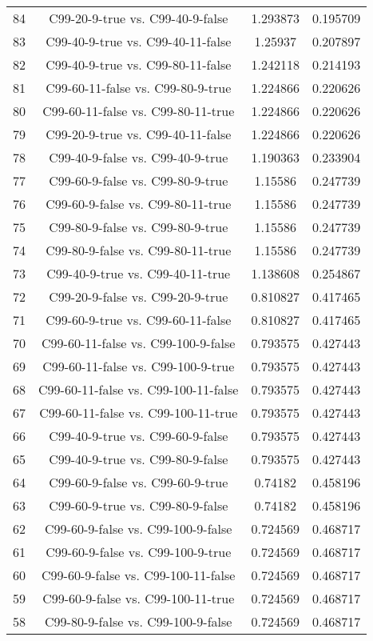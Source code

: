 \documentclass[a4paper,10pt]{article}
\begin{document}
\begin{landscape}
\begin{table}[!htp]
\begin{tabular}{cccc}
84&C99-20-9-true vs. C99-40-9-false&1.293873&0.195709\\
83&C99-40-9-true vs. C99-40-11-false&1.25937&0.207897\\
82&C99-40-9-true vs. C99-80-11-false&1.242118&0.214193\\
81&C99-60-11-false vs. C99-80-9-true&1.224866&0.220626\\
80&C99-60-11-false vs. C99-80-11-true&1.224866&0.220626\\
79&C99-20-9-true vs. C99-40-11-false&1.224866&0.220626\\
78&C99-40-9-false vs. C99-40-9-true&1.190363&0.233904\\
77&C99-60-9-false vs. C99-80-9-true&1.15586&0.247739\\
76&C99-60-9-false vs. C99-80-11-true&1.15586&0.247739\\
75&C99-80-9-false vs. C99-80-9-true&1.15586&0.247739\\
74&C99-80-9-false vs. C99-80-11-true&1.15586&0.247739\\
73&C99-40-9-true vs. C99-40-11-true&1.138608&0.254867\\
72&C99-20-9-false vs. C99-20-9-true&0.810827&0.417465\\
71&C99-60-9-true vs. C99-60-11-false&0.810827&0.417465\\
70&C99-60-11-false vs. C99-100-9-false&0.793575&0.427443\\
69&C99-60-11-false vs. C99-100-9-true&0.793575&0.427443\\
68&C99-60-11-false vs. C99-100-11-false&0.793575&0.427443\\
67&C99-60-11-false vs. C99-100-11-true&0.793575&0.427443\\
66&C99-40-9-true vs. C99-60-9-false&0.793575&0.427443\\
65&C99-40-9-true vs. C99-80-9-false&0.793575&0.427443\\
64&C99-60-9-false vs. C99-60-9-true&0.74182&0.458196\\
63&C99-60-9-true vs. C99-80-9-false&0.74182&0.458196\\
62&C99-60-9-false vs. C99-100-9-false&0.724569&0.468717\\
61&C99-60-9-false vs. C99-100-9-true&0.724569&0.468717\\
60&C99-60-9-false vs. C99-100-11-false&0.724569&0.468717\\
59&C99-60-9-false vs. C99-100-11-true&0.724569&0.468717\\
58&C99-80-9-false vs. C99-100-9-false&0.724569&0.468717\\

\end{tabular}
\end{table}
\end{landscape}
\end{document}
